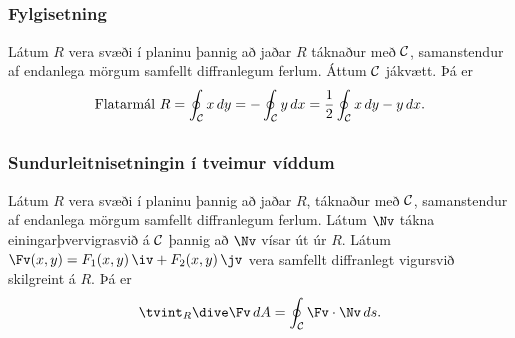 \subsection{} 

\subsubsection{Fylgisetning \rtask{}}
 Látum $R$ vera svæði í planinu þannig að
jaðar $R$ táknaður með $\cal C$, 
samanstendur af endanlega mörgum samfellt diffranlegum
ferlum.  Áttum $\cal C$ jákvætt. 
Þá er 
$$\mbox{Flatarmál } R=\oint_{\cal C}x\,dy= 
-\oint_{\cal C}y\,dx=\frac{1}{2}\oint_{\cal C}x\,dy-y\,dx.$$






\subsection{} 

\subsubsection{Sundurleitnisetningin í tveimur víddum \rtask{}}

Látum $R$ vera svæði í planinu þannig að
jaðar $R$, táknaður með $\cal C$,  
samanstendur af endanlega mörgum samfellt diffranlegum
ferlum.  Látum $\Nv$ tákna einingarþvervigrasvið á $\cal C$ þannig að
$\Nv$ vísar út úr $R$.  Látum
$\Fv(x,y)=F_1(x,y)\,\iv+F_2(x,y)\,\jv$ vera samfellt diffranlegt
vigursvið skilgreint á $R$.  Þá er 
$$\tvint_R\dive \Fv\,dA=\oint_{\cal C} \Fv\cdot\Nv\,ds.$$



